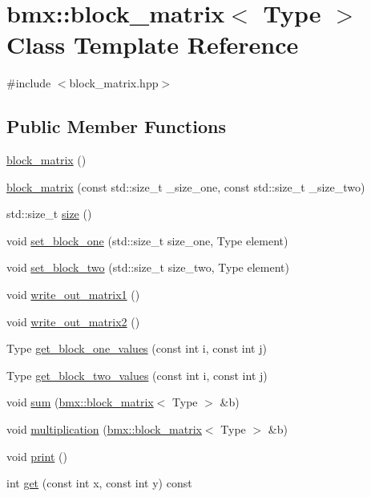 \hypertarget{classbmx_1_1block__matrix}{}\section{bmx\+:\+:block\+\_\+matrix$<$ Type $>$ Class Template Reference}
\label{classbmx_1_1block__matrix}


{\ttfamily \#include $<$block\+\_\+matrix.\+hpp$>$}

\subsection*{Public Member Functions}
\begin{DoxyCompactItemize}
\item 
\mbox{\hyperlink{classbmx_1_1block__matrix_a04826c7a53ad8da87b0e9eede8af679a}{block\+\_\+matrix}} ()
\item 
\mbox{\hyperlink{classbmx_1_1block__matrix_a8356cfaa8cc00082ec82070f4143b6fa}{block\+\_\+matrix}} (const std\+::size\+\_\+t \+\_\+size\+\_\+one, const std\+::size\+\_\+t \+\_\+size\+\_\+two)
\item 
std\+::size\+\_\+t \mbox{\hyperlink{classbmx_1_1block__matrix_afe5002a570f6c7ae455add2ab3ad3c87}{size}} ()
\item 
void \mbox{\hyperlink{classbmx_1_1block__matrix_a3708a438e204c7479da201365e088212}{set\+\_\+block\+\_\+one}} (std\+::size\+\_\+t size\+\_\+one, Type element)
\item 
void \mbox{\hyperlink{classbmx_1_1block__matrix_a1233de84f6828b5b3dd80af76c0688bd}{set\+\_\+block\+\_\+two}} (std\+::size\+\_\+t size\+\_\+two, Type element)
\item 
void \mbox{\hyperlink{classbmx_1_1block__matrix_a010884e7b07582cd28e1de9d58521b62}{write\+\_\+out\+\_\+matrix1}} ()
\item 
void \mbox{\hyperlink{classbmx_1_1block__matrix_a5e758f4af743778dedce4ce05f95a14a}{write\+\_\+out\+\_\+matrix2}} ()
\item 
Type \mbox{\hyperlink{classbmx_1_1block__matrix_ab8c567ac66dabb15646b951fe55f30b6}{get\+\_\+block\+\_\+one\+\_\+values}} (const int i, const int j)
\item 
Type \mbox{\hyperlink{classbmx_1_1block__matrix_a4737a14c292308edbf16d71b3b6240a2}{get\+\_\+block\+\_\+two\+\_\+values}} (const int i, const int j)
\item 
void \mbox{\hyperlink{classbmx_1_1block__matrix_aa6200f28e371684979facaf7494bd755}{sum}} (\mbox{\hyperlink{classbmx_1_1block__matrix}{bmx\+::block\+\_\+matrix}}$<$ Type $>$ \&b)
\item 
void \mbox{\hyperlink{classbmx_1_1block__matrix_a5a6c1c462b530c2dcf8bc24a0e6dc85c}{multiplication}} (\mbox{\hyperlink{classbmx_1_1block__matrix}{bmx\+::block\+\_\+matrix}}$<$ Type $>$ \&b)
\item 
void \mbox{\hyperlink{classbmx_1_1block__matrix_a6e7219a6e1c65c1ddcc1a64cdab56223}{print}} ()
\item 
int \mbox{\hyperlink{classbmx_1_1block__matrix_a3a4e7a297cb5e09564f0a3b74cbdfaec}{get}} (const int x, const int y) const
\end{DoxyCompactItemize}


